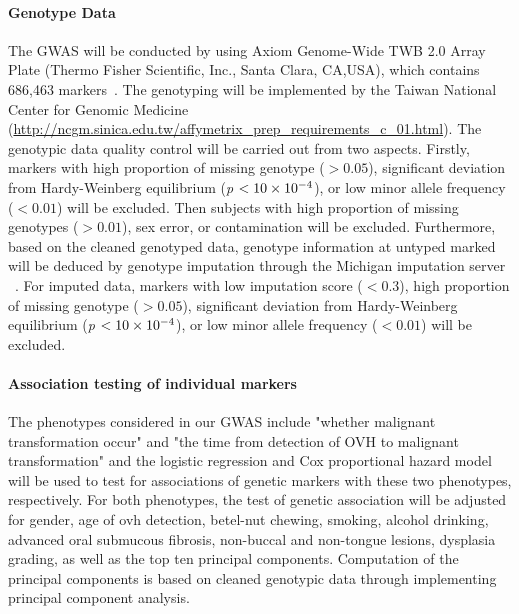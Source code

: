 \documentclass[12pt, a4paper]{article}
\begin{document}
\paragraph{Genotype Data}
The GWAS will be conducted by using Axiom Genome-Wide TWB 2.0 Array Plate (Thermo Fisher Scientific, Inc., Santa Clara, CA,USA), which contains 686,463 markers~\citep{Wei2021}. The genotyping will be implemented by the Taiwan National Center for Genomic Medicine (\url{http://ncgm.sinica.edu.tw/affymetrix_prep_requirements_c_01.html}). The genotypic data quality control will be carried out from two aspects. Firstly, markers with high proportion of missing genotype ($> 0.05$), significant deviation from Hardy-Weinberg equilibrium (\textit{p} $< \num{10E-4}$), or low minor allele frequency ($< 0.01$) will be excluded. Then subjects with high proportion of missing genotypes ($> 0.01$), sex error, or contamination will be excluded. Furthermore, based on the cleaned genotyped data, genotype information at untyped marked will be deduced by genotype imputation through the Michigan imputation server ~\citep{Das2016}. For imputed data, markers with low imputation score ($< 0.3$), high proportion of missing genotype ($> 0.05$), significant deviation from Hardy-Weinberg equilibrium (\textit{p} $< \num{10E-4}$), or low minor allele frequency ($< 0.01$) will be excluded. 

\paragraph{Association testing of individual markers} %
The phenotypes considered in our GWAS include "whether malignant transformation occur" and "the time from detection of OVH to malignant transformation" and the logistic regression and Cox proportional hazard model will be used to test for associations of genetic markers with these two phenotypes, respectively. For both phenotypes, the test of genetic association will be adjusted for gender, age of \acrshort{ovh} detection, betel-nut chewing, smoking, alcohol drinking, advanced oral submucous fibrosis, non-buccal and non-tongue lesions, dysplasia grading, as well as the top ten principal components. Computation of the principal components is based on cleaned genotypic data through implementing principal component analysis. 
\end{document}
